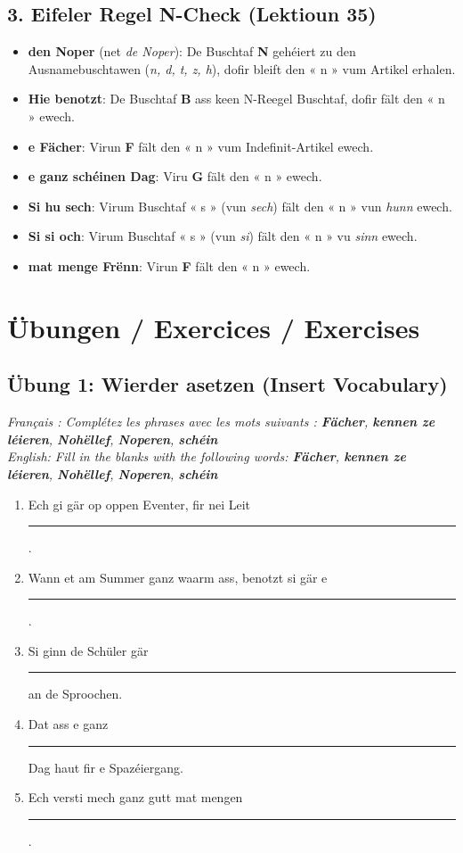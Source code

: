 \subsection*{3. Eifeler Regel N-Check (Lektioun 35)}
\begin{itemize}
    \item \textbf{den Noper} (net \textit{de Noper}): De Buschtaf \textbf{N} gehéiert zu den Ausnamebuschtawen (\textit{n, d, t, z, h}), dofir bleift den « n » vum Artikel erhalen.
    \item \textbf{Hie benotzt}: De Buschtaf \textbf{B} ass keen N-Reegel Buschtaf, dofir fält den « n » ewech.
    \item \textbf{e Fächer}: Virun \textbf{F} fält den « n » vum Indefinit-Artikel ewech.
    \item \textbf{e ganz schéinen Dag}: Viru \textbf{G} fält den « n » ewech.
    \item \textbf{Si hu sech}: Virum Buschtaf « s » (vun \textit{sech}) fält den « n » vun \textit{hunn} ewech.
    \item \textbf{Si si och}: Virum Buschtaf « s » (vun \textit{si}) fält den « n » vu \textit{sinn} ewech.
    \item \textbf{mat menge Frënn}: Virun \textbf{F} fält den « n » ewech.
\end{itemize}

\vspace{1.5em}

\section[Übungen / Exercises]{Übungen / Exercices / Exercises}

\subsection*{Übung 1: Wierder asetzen (Insert Vocabulary)}
\textit{Français : Complétez les phrases avec les mots suivants : \textbf{Fächer}, \textbf{kennen ze léieren}, \textbf{Nohëllef}, \textbf{Noperen}, \textbf{schéin}}\\
\textit{English: Fill in the blanks with the following words: \textbf{Fächer}, \textbf{kennen ze léieren}, \textbf{Nohëllef}, \textbf{Noperen}, \textbf{schéin}}

\begin{enumerate}
    \item Ech gi gär op oppen Eventer, fir nei Leit \rule{3.5cm}{0.4pt}.
    \item Wann et am Summer ganz waarm ass, benotzt si gär e \rule{3.5cm}{0.4pt}.
    \item Si ginn de Schüler gär \rule{3.5cm}{0.4pt} an de Sproochen.
    \item Dat ass e ganz \rule{3.5cm}{0.4pt} Dag haut fir e Spazéiergang.
    \item Ech versti mech ganz gutt mat mengen \rule{3.5cm}{0.4pt}.
\end{enumerate}

